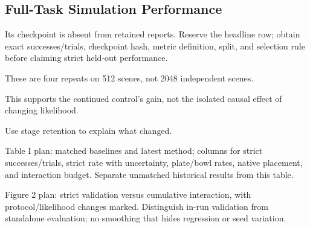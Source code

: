\subsection{Full-Task Simulation Performance}
\begin{outline}
\item {} Its checkpoint is absent from retained reports. Reserve the headline row; obtain exact successes/trials, checkpoint hash, metric definition, split, and selection rule before claiming strict held-out performance.
\item {} These are four repeats on 512 scenes, not 2048 independent scenes.
\item {} This supports the continued control's gain, not the isolated causal effect of changing likelihood.
\item {} Use stage retention to explain what changed.
\item Table I plan: matched baselines and latest method; columns for strict successes/trials, strict rate with uncertainty, plate/bowl rates, native placement, and interaction budget. Separate unmatched historical results from this table.
\item Figure 2 plan: strict validation versus cumulative interaction, with protocol/likelihood changes marked. Distinguish in-run validation from standalone evaluation; no smoothing that hides regression or seed variation.
\end{outline}
